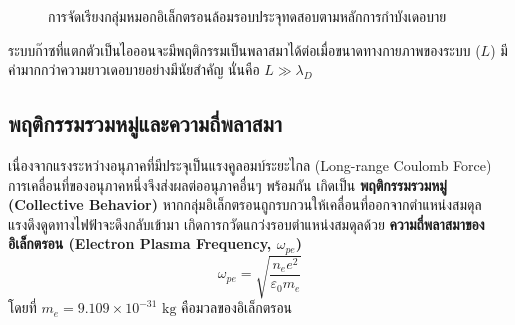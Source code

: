 \begin{figure}[H]
\centering
{}
\caption{การจัดเรียงกลุ่มหมอกอิเล็กตรอนล้อมรอบประจุทดสอบตามหลักการกำบังเดอบาย}
\label{fig:debye_shielding}
\end{figure}

ระบบก๊าซที่แตกตัวเป็นไอออนจะมีพฤติกรรมเป็นพลาสมาได้ต่อเมื่อขนาดทางกายภาพของระบบ ($L$) มีค่ามากกว่าความยาวเดอบายอย่างมีนัยสำคัญ นั่นคือ $L \gg \lambda_D$

\subsection{พฤติกรรมรวมหมู่และความถี่พลาสมา}

เนื่องจากแรงระหว่างอนุภาคที่มีประจุเป็นแรงคูลอมบ์ระยะไกล (Long-range Coulomb Force) การเคลื่อนที่ของอนุภาคหนึ่งจึงส่งผลต่ออนุภาคอื่นๆ พร้อมกัน เกิดเป็น \textbf{พฤติกรรมรวมหมู่ (Collective Behavior)} หากกลุ่มอิเล็กตรอนถูกรบกวนให้เคลื่อนที่ออกจากตำแหน่งสมดุล แรงดึงดูดทางไฟฟ้าจะดึงกลับเข้ามา เกิดการกวัดแกว่งรอบตำแหน่งสมดุลด้วย \textbf{ความถี่พลาสมาของอิเล็กตรอน (Electron Plasma Frequency, $\omega_{pe}$)}
\begin{equation}
    \omega_{pe} = \sqrt{\frac{n_e e^2}{\varepsilon_0 m_e}}
\end{equation}
โดยที่ $m_e = 9.109 \times 10^{-31}\text{ kg}$ คือมวลของอิเล็กตรอน

